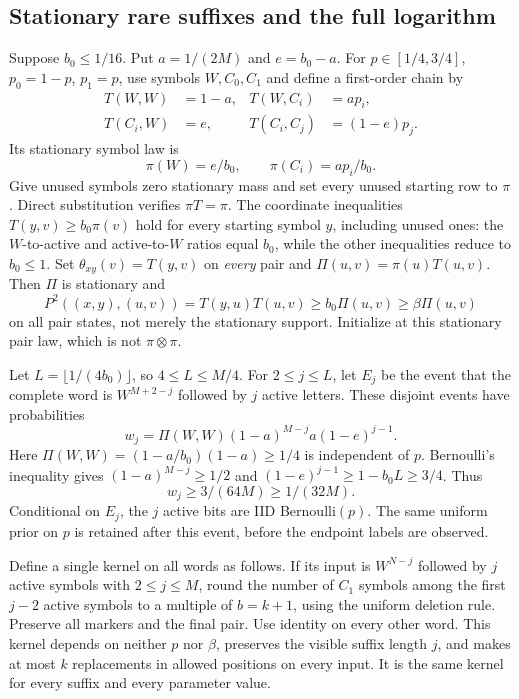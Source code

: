 \subsection{Stationary rare suffixes and the full logarithm}
Suppose $b_0\leq1/16$.  Put $a=1/(2M)$ and $e=b_0-a$.
For $p\in[1/4,3/4]$, $p_0=1-p$, $p_1=p$, use symbols $W,C_0,C_1$
and define a first-order chain by
\begin{align*}
 T(W,W)&=1-a,& T(W,C_i)&=ap_i,\\
 T(C_i,W)&=e,&T(C_i,C_j)&=(1-e)p_j.
\end{align*}
Its stationary symbol law is
\[
 \pi(W)=e/b_0,\qquad\pi(C_i)=ap_i/b_0.
\]
Give unused symbols zero stationary mass and set every unused starting
row to $\pi$.  Direct substitution verifies $\pi T=\pi$.
The coordinate inequalities $T(y,v)\geq b_0\pi(v)$ hold for every
starting symbol $y$, including unused ones: the $W$-to-active and
active-to-$W$ ratios equal $b_0$, while the other inequalities reduce
to $b_0\leq1$.  Set $\theta_{xy}(v)=T(y,v)$ on \emph{every} pair and
$\Pi(u,v)=\pi(u)T(u,v)$.  Then $\Pi$ is stationary and
\begin{equation}\label{eq:nb-allstate-witness}
 P^2((x,y),(u,v))=T(y,u)T(u,v)
 \geq b_0\Pi(u,v)\geq\beta\Pi(u,v)
\end{equation}
on all pair states, not merely the stationary support.
Initialize at this stationary pair law, which is not $\pi\otimes\pi$.

Let $L=\lfloor1/(4b_0)\rfloor$, so $4\leq L\leq M/4$.
For $2\leq j\leq L$, let $E_j$ be the event that the complete word is
$W^{M+2-j}$ followed by $j$ active letters.  These disjoint events have
probabilities
\[
 w_j=\Pi(W,W)(1-a)^{M-j}a(1-e)^{j-1}.
\]
Here $\Pi(W,W)=(1-a/b_0)(1-a)\geq1/4$ is independent of $p$.
Bernoulli's inequality gives
$(1-a)^{M-j}\geq1/2$ and
$(1-e)^{j-1}\geq1-b_0L\geq3/4$.  Thus
\begin{equation}\label{eq:nb-event-mass}
 w_j\geq3/(64M)\geq1/(32M).
\end{equation}
Conditional on $E_j$, the $j$ active bits are IID Bernoulli$(p)$.
The same uniform prior on $p$ is retained after this event, before the
endpoint labels are observed.

Define a single kernel on all words as follows.  If its input is
$W^{N-j}$ followed by $j$ active symbols with $2\leq j\leq M$, round
the number of $C_1$ symbols among the first $j-2$ active symbols to a
multiple of $b=k+1$, using the uniform deletion rule.  Preserve all
markers and the final pair.  Use identity on every other word.
This kernel depends on neither $p$ nor $\beta$, preserves the visible
suffix length $j$, and makes at most $k$ replacements in allowed
positions on every input.  It is the same kernel for every suffix and
every parameter value.

